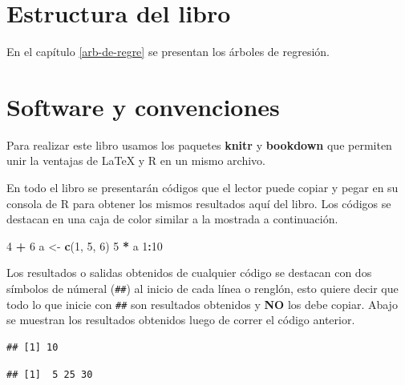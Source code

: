\documentclass[]{book}
\makeatletter
\newenvironment{Shaded}{\begin{snugshade}}{\end{snugshade}}
\newcommand{\DecValTok}[1]{\textcolor[rgb]{0.00,0.00,0.81}{#1}}
\newcommand{\KeywordTok}[1]{\textcolor[rgb]{0.13,0.29,0.53}{\textbf{#1}}}
\newcommand{\NormalTok}[1]{#1}
\newcommand{\OperatorTok}[1]{\textcolor[rgb]{0.81,0.36,0.00}{\textbf{#1}}}
\newcommand{\StringTok}[1]{\textcolor[rgb]{0.31,0.60,0.02}{#1}}
\newenvironment{kframe}{%
\medskip{}
\setlength{\fboxsep}{.8em}
 \def\at@end@of@kframe{}%
 \ifinner\ifhmode%
  \def\at@end@of@kframe{\end{minipage}}%
  \begin{minipage}{\columnwidth}%
 \fi\fi%
 \def\FrameCommand##1{\hskip\@totalleftmargin \hskip-\fboxsep
 \colorbox{shadecolor}{##1}\hskip-\fboxsep
     \hskip-\linewidth \hskip-\@totalleftmargin \hskip\columnwidth}%
 \MakeFramed {\advance\hsize-\width
   \@totalleftmargin\z@ \linewidth\hsize
   \@setminipage}}%
 {\par\unskip\endMakeFramed%
 \at@end@of@kframe}
\renewenvironment{Shaded}{\begin{kframe}}{\end{kframe}}
\makeatother
\begin{document}
\hypertarget{estructura-del-libro}{%
\section*{Estructura del libro}\label{estructura-del-libro}}

En el capítulo \ref{arb-de-regre} se presentan los árboles de regresión.

\hypertarget{software-y-convenciones}{%
\section*{Software y convenciones}\label{software-y-convenciones}}

Para realizar este libro usamos los paquetes \textbf{knitr} \citep{xie2015} y \textbf{bookdown} \citep{R-bookdown} que permiten unir la ventajas de LaTeX y R en un mismo archivo.

En todo el libro se presentarán códigos que el lector puede copiar y pegar en su consola de R para obtener los mismos resultados aquí del libro. Los códigos se destacan en una caja de color similar a la mostrada a continuación.

\begin{Shaded}
\begin{Highlighting}[]
\DecValTok{4} \OperatorTok{+}\StringTok{ }\DecValTok{6}
\NormalTok{a <-}\StringTok{ }\KeywordTok{c}\NormalTok{(}\DecValTok{1}\NormalTok{, }\DecValTok{5}\NormalTok{, }\DecValTok{6}\NormalTok{)}
\DecValTok{5} \OperatorTok{*}\StringTok{ }\NormalTok{a}
\DecValTok{1}\OperatorTok{:}\DecValTok{10}
\end{Highlighting}
\end{Shaded}

Los resultados o salidas obtenidos de cualquier código se destacan con dos símbolos de númeral (\texttt{\#\#}) al inicio de cada línea o renglón, esto quiere decir que todo lo que inicie con \texttt{\#\#} son resultados obtenidos y \textbf{NO} los debe copiar. Abajo se muestran los resultados obtenidos luego de correr el código anterior.

\begin{verbatim}
## [1] 10
\end{verbatim}

\begin{verbatim}
## [1]  5 25 30
\end{verbatim}
\end{document}
